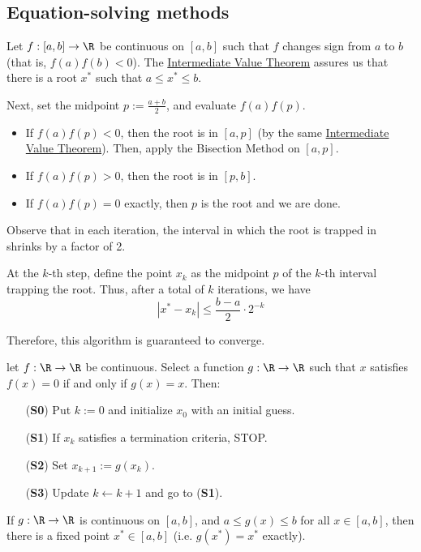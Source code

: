 \subsection{Equation-solving methods}\label{b000a1e}

\label{e13a0f6}

Let $f:[a,b]\to\R$ be continuous on $[a,b]$ such that $f$ changes sign from $a$
to $b$ (that is, $f(a)f(b)<0$). The \href{d8d9745}{Intermediate Value Theorem}
assures us that there is a root $x^*$ such that $a\leq x^*\leq b$.

Next, set the midpoint $p:=\frac{a+b}2$, and evaluate $f(a)f(p)$.
\begin{itemize}
  \item If $f(a)f(p)<0$, then the root is in $[a,p]$ (by the same
        \href{d8d9745}{Intermediate Value Theorem}). Then, apply the Bisection
        Method on $[a,p]$.
  \item If $f(a)f(p)>0$, then the root is in $[p,b]$.
  \item If $f(a)f(p)=0$ exactly, then $p$ is the root and we are done.
\end{itemize}

Observe that in each iteration, the interval in which the root is trapped in
shrinks by a factor of 2.

At the $k$-th step, define the point $x_k$ as the midpoint $p$ of the $k$-th
interval trapping the root. Thus, after a total of $k$ iterations, we have
$$
  |x^*-x_k|\leq\frac{b-a}2\cdot2^{-k}
$$

Therefore, this algorithm is guaranteed to converge.

\label{bb9fc33}

let $f:\R\to\R$ be continuous. Select a function $g:\R\to\R$ such that $x$
satisfies $f(x)=0$ if and only if $g(x)=x$. Then:
\begin{itemize}
  \item[(\textbf{S0})] Put $k:=0$ and initialize $x_0$ with an initial guess.
  \item[(\textbf{S1})] If $x_k$ satisfies a termination criteria, STOP.
  \item[(\textbf{S2})] Set $x_{k+1}:=g(x_k)$.
  \item[(\textbf{S3})] Update $k\gets k+1$ and go to (\textbf{S1}).
\end{itemize}

\label{df053ed}

If $g:\R\to\R$ is continuous on $[a,b]$, and $a\leq g(x)\leq b$ for all
$x\in[a,b]$, then there is a fixed point $x^*\in[a,b]$ (i.e. $g(x^*)=x^*$
exactly).

